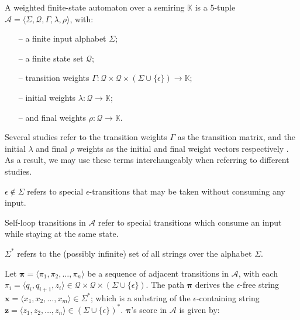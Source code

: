 \begin{definition}
  \label{def:wfsa}
  A weighted finite-state automaton over a semiring $\mathbb{K}$ is a 5-tuple $\mathcal{A} = \langle \Sigma, \mathcal{Q}, \Gamma, \lambda, \rho \rangle$, with:

  \begin{itemize}
    \itemsep0em 
    \item[--] a finite input alphabet $\Sigma$;
    \item[--] a finite state set $\mathcal{Q}$;
    \item[--] transition weights $\Gamma: \mathcal{Q} \times \mathcal{Q} \times (\Sigma \cup \{\epsilon\}) \rightarrow \mathbb{K}$;
    \item[--] initial weights $\lambda: \mathcal{Q} \rightarrow \mathbb{K}$; 
    \item[--] and final weights $\rho: \mathcal{Q} \rightarrow \mathbb{K}$.
  \end{itemize}

  \begin{remark}
    Several studies refer to the transition weights $\Gamma$ as the transition matrix, and the initial $\lambda$ and final $\rho$ weights as the initial and final weight vectors respectively \citep{schwartz2018sopa,jiang2020cold}. As a result, we may use these terms interchangeably when referring to different studies.
  \end{remark}
  
  \begin{remark}
    $\epsilon \notin \Sigma$ refers to special $\epsilon$-transitions that may be taken without consuming any input.
  \end{remark}

  \begin{remark}
    Self-loop transitions in $\mathcal{A}$ refer to special transitions which consume an input while staying at the same state.
  \end{remark}
  
  \begin{remark}
    $\Sigma^{*}$ refers to the (possibly infinite) set of all strings over the alphabet $\Sigma$.
  \end{remark}
   
\end{definition}

\begin{definition}

  Let $\pmb{\pi} = \langle \pi_1, \pi_2, \dots, \pi_n \rangle$ be a sequence of adjacent transitions in $\mathcal{A}$, with each $\pi_i = \langle q_i, q_{i+1}, z_i \rangle \in \mathcal{Q} \times \mathcal{Q} \times (\Sigma \cup \{\epsilon\})$. The path $\pmb{\pi}$ derives the $\epsilon$-free string $\pmb{x} = \langle x_1, x_2, \dots, x_m \rangle \in \Sigma^{*}$; which is a substring of the $\epsilon$-containing string $\pmb{z} = \langle z_1, z_2, \dots, z_n \rangle \in (\Sigma \cup \{\epsilon\})^{*}$. $\pmb{\pi}$'s score in $\mathcal{A}$ is given by:
  
\end{definition}

